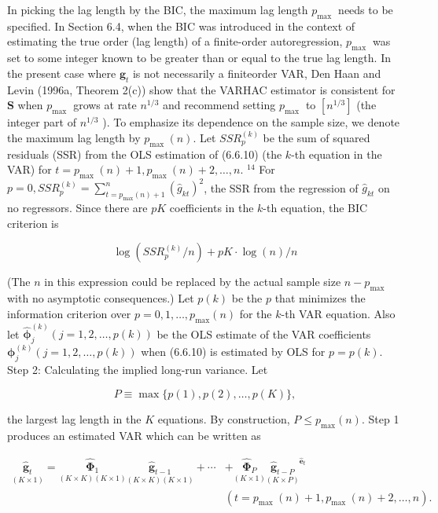 \documentclass[10pt]{article}
\begin{document}
In picking the lag length by the BIC, the maximum lag length $p_{\text {max }}$ needs to be specified. In Section 6.4, when the BIC was introduced in the context of estimating the true order (lag length) of a finite-order autoregression, $p_{\text {max }}$ was set to some integer known to be greater than or equal to the true lag length. In the present case where $\mathbf{g}_{t}$ is not necessarily a finiteorder VAR, Den Haan and Levin (1996a, Theorem 2(c)) show that the VARHAC estimator is consistent for $\mathbf{S}$ when $p_{\text {max }}$ grows at rate $n^{1 / 3}$ and recommend setting $p_{\text {max }}$ to $\left[n^{1 / 3}\right]$ (the integer part of $n^{1 / 3}$ ). To emphasize its dependence on the sample size, we denote the maximum lag length by $p_{\text {max }}(n)$. Let $S S R_{p}^{(k)}$ be the sum of squared residuals (SSR) from the OLS estimation of (6.6.10) (the $k$-th equation in the VAR) for $t=p_{\text {max }}(n)+ 1, p_{\text {max }}(n)+2, \ldots, n$. ${ }^{14}$ For $p=0, S S R_{p}^{(k)}=\sum_{t=p_{\max }(n)+1}^{n}\left(\hat{g}_{k t}\right)^{2}$, the SSR from the regression of $\hat{g}_{k t}$ on no regressors. Since there are $p K$ coefficients in the $k$-th equation, the BIC criterion is


\begin{equation*}
\log \left(S S R_{p}^{(k)} / n\right)+p K \cdot \log (n) / n \tag{6.6.11}
\end{equation*}


(The $n$ in this expression could be replaced by the actual sample size $n- p_{\text {max }}$ with no asymptotic consequences.) Let $p(k)$ be the $p$ that minimizes the information criterion over $p=0,1, \ldots, p_{\max }(n)$ for the $k$-th VAR equation. Also let $\hat{\boldsymbol{\phi}}_{j}^{(k)}(j=1,2, \ldots, p(k))$ be the OLS estimate of the VAR coefficients $\boldsymbol{\phi}_{j}^{(k)}(j=1,2, \ldots, p(k))$ when (6.6.10) is estimated by OLS for $p=p(k)$.\\
Step 2: Calculating the implied long-run variance. Let

$$
P \equiv \max \{p(1), p(2), \ldots, p(K)\},
$$

the largest lag length in the $K$ equations. By construction, $P \leq p_{\max }(n)$. Step 1 produces an estimated VAR which can be written as


\begin{align*}
\underset{(K \times 1)}{\hat{\mathbf{g}}_{t}}=\underset{(K \times K)(K \times 1)}{\widehat{\mathbf{\Phi}}_{1}} \underset{(K \times K)(K \times 1)}{\hat{\mathbf{g}}_{t-1}}+\cdots & +\underset{(K \times 1)}{\widehat{\mathbf{\Phi}}_{P}}{\underset{(K \times P)}{\hat{\mathbf{g}}_{t-P}}}^{\hat{\mathbf{e}}_{t}} \\
& \left(t=p_{\text {max }}(n)+1, p_{\text {max }}(n)+2, \ldots, n\right) . \tag{6.6.12}
\end{align*}
\end{document}
